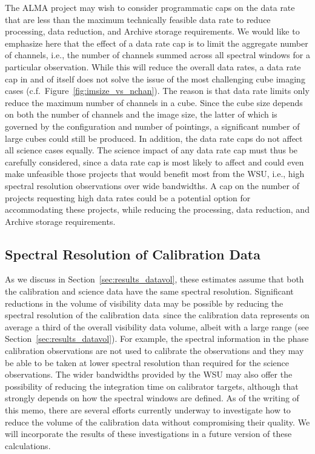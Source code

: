 \documentclass[preprint]{aastex631}
\begin{document}
The ALMA project may wish to consider programmatic caps on the data rate that are less than the maximum technically feasible data rate to reduce processing, data reduction, and Archive storage requirements. We would like to emphasize here that the effect of a data rate cap is to limit the aggregate number of channels, i.e., the number of channels summed across all spectral windows for a particular observation.  While this will reduce the overall data rates, a data rate cap in and of itself does not solve the issue of the most challenging cube imaging cases (c.f.\ Figure~\ref{fig:imsize_vs_nchan}). The reason is that data rate limits only reduce the maximum number of channels in a cube. Since the cube size depends on both the number of channels and the image size, the latter of which is governed by the configuration and number of pointings, a significant number of large cubes could still be produced. In addition, the data rate caps do not affect all science cases equally. The science impact of any data rate cap must thus be carefully considered, since a data rate cap is most likely to affect and could even make unfeasible those projects that would benefit most from the WSU, i.e., high spectral resolution observations over wide bandwidths. A cap on the number of projects requesting high data rates could be a potential option for accommodating these projects, while reducing the processing, data reduction, and Archive storage requirements.

\subsection{Spectral Resolution of Calibration Data}\label{sec:discussion_calibration}

As we discuss in Section~\ref{sec:results_datavol}, these estimates assume that both the calibration and science data have the same spectral resolution. Significant reductions in the volume of visibility data may be possible by reducing the spectral resolution of the calibration data\, since the calibration data represents on average a third of the overall visibility data volume, albeit with a large range (see Section~\ref{sec:results_datavol}). For example, the spectral information in the phase calibration observations are not used to calibrate the observations and they may be able to be taken at lower spectral resolution than required for the science observations.  The wider bandwidths provided by the WSU may also offer the possibility of reducing the integration time on calibrator targets, although that strongly depends on how the spectral windows are defined. As of the writing of this memo, there are several efforts currently underway to investigate how to reduce the volume of the calibration data without compromising their quality.  We will incorporate the results of these investigations in a future version of these calculations.
\end{document}
